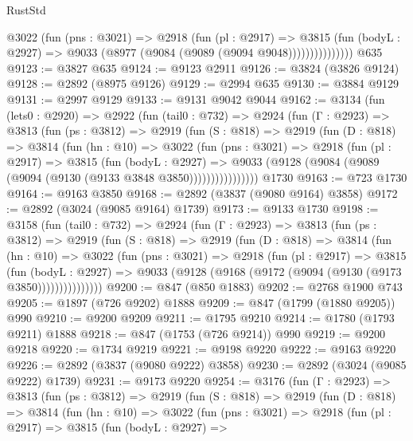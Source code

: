 \begin{lexlean}{RustStd}
\begin{coremodule}
                  @3022
                    (fun (pns : @3021) =>
                    @2918
                      (fun (pl : @2917) =>
                      @3815
                        (fun (bodyL : @2927) =>
                        @9033 (@8977 (@9084 (@9089 (@9094 @9048)))))))))))))))
    @635
@9123 := @3827 @635
@9124 := @9123 @2911
@9126 := @3824 (@3826 @9124)
@9128 := @2892 (@8975 @9126)
@9129 := @2994 @635
@9130 := @3884 @9129
@9131 := @2997 @9129
@9133 := @9131 @9042 @9044
@9162 := @3134
    (fun (lets0 : @2920) =>
    @2922
      (fun (tail0 : @732) =>
      @2924
        (fun (Γ : @2923) =>
        @3813
          (fun (ps : @3812) =>
          @2919
            (fun (S : @818) =>
            @2919
              (fun (D : @818) =>
              @3814
                (fun (hn : @10) =>
                @3022
                  (fun (pns : @3021) =>
                  @2918
                    (fun (pl : @2917) =>
                    @3815
                      (fun (bodyL : @2927) =>
                      @9033 (@9128 (@9084 (@9089 (@9094 (@9130 (@9133 @3848 @3850))))))))))))))))
    @1730
@9163 := @723 @1730
@9164 := @9163 @3850
@9168 := @2892 (@3837 (@9080 @9164) @3858)
@9172 := @2892 (@3024 (@9085 @9164) @1739)
@9173 := @9133 @1730
@9198 := @3158
    (fun (tail0 : @732) =>
    @2924
      (fun (Γ : @2923) =>
      @3813
        (fun (ps : @3812) =>
        @2919
          (fun (S : @818) =>
          @2919
            (fun (D : @818) =>
            @3814
              (fun (hn : @10) =>
              @3022
                (fun (pns : @3021) =>
                @2918
                  (fun (pl : @2917) =>
                  @3815
                    (fun (bodyL : @2927) =>
                    @9033 (@9128 (@9168 (@9172 (@9094 (@9130 (@9173 @3850)))))))))))))))
@9200 := @847 (@850 @1883)
@9202 := @2768 @1900 @743
@9205 := @1897 (@726 @9202) @1888
@9209 := @847 (@1799 (@1880 @9205)) @990
@9210 := @9200 @9209
@9211 := @1795 @9210
@9214 := @1780 (@1793 @9211) @1888
@9218 := @847 (@1753 (@726 @9214)) @990
@9219 := @9200 @9218
@9220 := @1734 @9219
@9221 := @9198 @9220
@9222 := @9163 @9220
@9226 := @2892 (@3837 (@9080 @9222) @3858)
@9230 := @2892 (@3024 (@9085 @9222) @1739)
@9231 := @9173 @9220
@9254 := @3176
    (fun (Γ : @2923) =>
    @3813
      (fun (ps : @3812) =>
      @2919
        (fun (S : @818) =>
        @2919
          (fun (D : @818) =>
          @3814
            (fun (hn : @10) =>
            @3022
              (fun (pns : @3021) =>
              @2918
                (fun (pl : @2917) =>
                @3815
                  (fun (bodyL : @2927) =>

\end{coremodule}
\end{lexlean}

